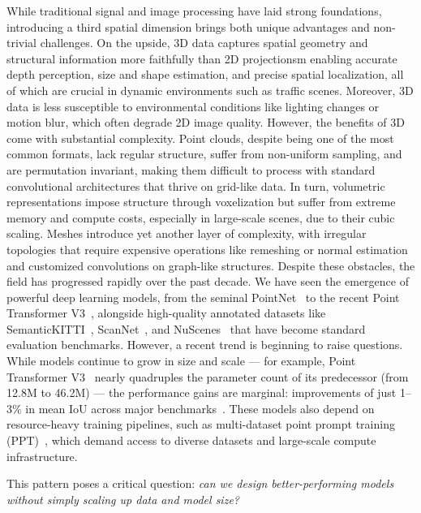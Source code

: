 While traditional signal and image processing have laid strong foundations,
introducing a third spatial dimension brings both unique advantages and
non-trivial challenges. On the upside, 3D data captures spatial geometry and
structural information more faithfully than 2D projectionsm enabling accurate
depth perception, size and shape estimation, and precise spatial localization,
all of which are crucial in dynamic environments such as traffic scenes.
%
Moreover, 3D data is less susceptible to environmental conditions like lighting
changes or motion blur, which often degrade 2D image quality.
%
However, the benefits of 3D come with substantial complexity. Point clouds,
despite being one of the most common formats, lack regular structure, suffer
from non-uniform sampling, and are permutation invariant, making them difficult
to process with standard convolutional architectures that thrive on grid-like
data. In turn, volumetric representations impose structure through voxelization
but suffer from extreme memory and compute costs, especially in large-scale
scenes, due to their cubic scaling.
%
Meshes introduce yet another layer of complexity, with irregular topologies
that require expensive operations like remeshing or normal estimation and
customized convolutions on graph-like structures.
%
Despite these obstacles, the field has progressed rapidly over the past decade.
We have seen the emergence of powerful deep learning models, from the seminal
PointNet~\cite{qi2017pointnet} to the recent Point Transformer
V3~\cite{wu2023ptv3}, alongside high-quality annotated datasets like
SemanticKITTI~\cite{behley2019semantickitti}, ScanNet~\cite{dai2017scannet},
and NuScenes~\cite{caesar2020nuscenes} that have become standard evaluation
benchmarks.
%
However, a recent trend is beginning to raise questions. While models continue
to grow in size and scale --- for example, Point Transformer
V3~\cite{wu2023ptv3} nearly quadruples the parameter count of its predecessor
(from 12.8M to 46.2M) --- the performance gains are marginal: improvements of
just 1–3\% in mean IoU across major
benchmarks~\cite{behley2019semantickitti,dai2017scannet,caesar2020nuscenes}.
These models also depend on resource-heavy training pipelines, such as
multi-dataset point prompt training (PPT)~\cite{wu2024towards}, which demand
access to diverse datasets and large-scale compute infrastructure.

This pattern poses a critical question: \textit{can we design better-performing
    models without simply scaling up data and model size?}

